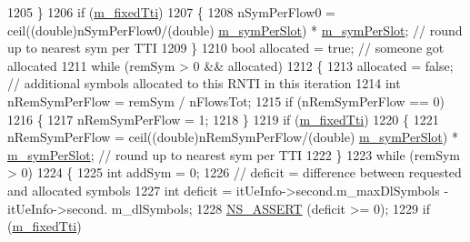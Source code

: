 \begin{DoxyCode}
1205                 \}
1206                 \textcolor{keywordflow}{if} (\hyperlink{classns3_1_1MmWaveFlexTtiMacScheduler_aac44befc273f7bdb0f0be0efc3d05f34}{m\_fixedTti})
1207                 \{
1208                         nSymPerFlow0 = ceil((\textcolor{keywordtype}{double})nSymPerFlow0/(\textcolor{keywordtype}{double})
      \hyperlink{classns3_1_1MmWaveFlexTtiMacScheduler_aa911d95e2956fcccca151a7353b8d42f}{m\_symPerSlot}) * \hyperlink{classns3_1_1MmWaveFlexTtiMacScheduler_aa911d95e2956fcccca151a7353b8d42f}{m\_symPerSlot}; \textcolor{comment}{// round up to nearest sym per TTI}
1209                 \}
1210                 \textcolor{keywordtype}{bool} allocated = \textcolor{keyword}{true}; \textcolor{comment}{// someone got allocated}
1211                 \textcolor{keywordflow}{while} (remSym > 0 && allocated)
1212                 \{
1213                         allocated = \textcolor{keyword}{false};  \textcolor{comment}{// additional symbols allocated to this RNTI in this iteration}
1214                         \textcolor{keywordtype}{int} nRemSymPerFlow = remSym / nFlowsTot;
1215                         \textcolor{keywordflow}{if} (nRemSymPerFlow == 0)
1216                         \{
1217                                 nRemSymPerFlow = 1;
1218                         \}
1219                         \textcolor{keywordflow}{if} (\hyperlink{classns3_1_1MmWaveFlexTtiMacScheduler_aac44befc273f7bdb0f0be0efc3d05f34}{m\_fixedTti})
1220                         \{
1221                                 nRemSymPerFlow = ceil((\textcolor{keywordtype}{double})nRemSymPerFlow/(\textcolor{keywordtype}{double})
      \hyperlink{classns3_1_1MmWaveFlexTtiMacScheduler_aa911d95e2956fcccca151a7353b8d42f}{m\_symPerSlot}) * \hyperlink{classns3_1_1MmWaveFlexTtiMacScheduler_aa911d95e2956fcccca151a7353b8d42f}{m\_symPerSlot}; \textcolor{comment}{// round up to nearest sym per TTI}
1222                         \}
1223                         \textcolor{keywordflow}{while} (remSym > 0)
1224                         \{
1225                                 \textcolor{keywordtype}{int} addSym = 0;
1226                                 \textcolor{comment}{// deficit = difference between requested and allocated symbols}
1227                                 \textcolor{keywordtype}{int} deficit = itUeInfo->second.m\_maxDlSymbols - itUeInfo->second.
      m\_dlSymbols;
1228                                 \hyperlink{assert_8h_a6dccdb0de9b252f60088ce281c49d052}{NS\_ASSERT} (deficit >= 0);
1229                                 \textcolor{keywordflow}{if} (\hyperlink{classns3_1_1MmWaveFlexTtiMacScheduler_aac44befc273f7bdb0f0be0efc3d05f34}{m\_fixedTti})

\end{DoxyCode}
